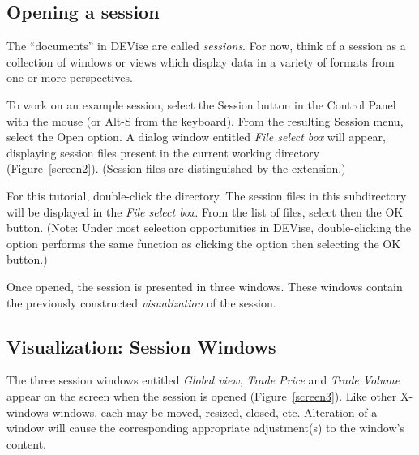 
\subsection{Opening a session}

The ``documents'' in DEVise are called {\em sessions}. For now, think of a
session as a collection of windows or views which display data in a variety of
formats from one or more perspectives.

To work on an example session, select the Session button in the Control Panel
with the mouse (or Alt-S from the keyboard). From the resulting Session menu,
select the Open option. A dialog window entitled {\em File select box} will
appear, displaying session files present in the current working directory
(Figure~\ref{screen2}). (Session files are distinguished by the 
extension.)


For this tutorial, double-click the  directory. The session
files in this subdirectory will be displayed in the {\em File select box}. From
the list of files, select  then the OK button. (Note: Under
most selection opportunities in DEVise, double-clicking the option performs the
same function as clicking the option then selecting the OK button.)

Once opened, the  session is presented in three windows.
These windows contain the previously constructed {\em visualization} of the
session.


\subsection{Visualization: Session Windows}

The three session windows entitled {\em Global view}, {\em Trade Price} and {\em
Trade Volume} appear on the screen when the session is opened
(Figure~\ref{screen3}). Like other X-windows windows, each may be moved,
resized, closed, etc. Alteration of a window will cause the corresponding
appropriate adjustment(s) to the window's content.


